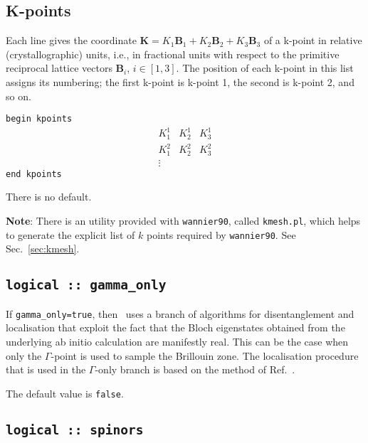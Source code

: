 %


\subsection[Kpoints]{K-points}
Each line gives the coordinate $\mathbf{K}=K_1 \mathbf{B}_{1} + K_2
\mathbf{B}_{2} + K_3 \mathbf{B}_3$ of a k-point
in relative (crystallographic) units, i.e., in fractional units with
respect to the primitive reciprocal lattice vectors $\mathbf{B}_{i}$,
$i \in [1,3]$. The position  of each
k-point in this list assigns its numbering; the first k-point is
k-point 1, the second is k-point 2, and so on.


\noindent \verb#begin kpoints# \\
$$
\begin{array}{ccc}
 K^{1}_{1} & K^{1}_{2} & K^{1}_{3} \\
 K^{2}_{1} & K^{2}_{2} & K^{2}_{3} \\
\vdots
\end{array}
$$
\verb#end kpoints#


There is no default.

{\bfseries Note}: There is an utility provided with {\tt wannier90},
called {\tt kmesh.pl}, which helps to generate the explicit list of
$k$ points required by {\tt wannier90}. See Sec.~\ref{sec:kmesh}.

\subsection[gamma\_only]{{\tt logical :: gamma\_only}}

If {\tt gamma\_only=true}, then \wannier\ uses a branch of algorithms
for disentanglement and localisation that exploit the fact that the 
Bloch eigenstates obtained from the underlying ab initio calculation
are manifestly real. This can be the case when only the $\Gamma$-point
is used to sample the Brillouin zone. The localisation procedure
that is used in the $\Gamma$-only branch is based on the method of
Ref.~\cite{gygi-cpc03}.

The default value is {\tt false}.


\subsection[spinors]{{\tt logical :: spinors}}

